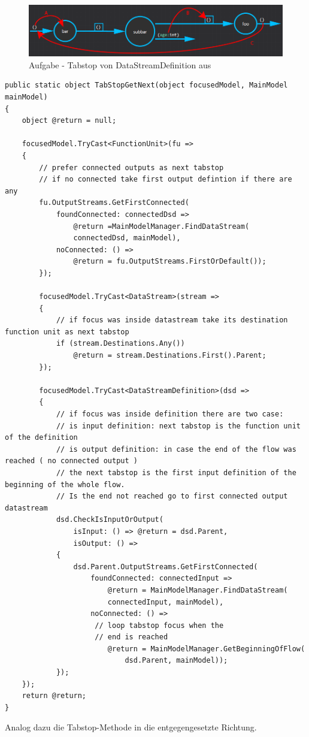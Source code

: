 \begin{enumerate}
	
	\begin{figure}[H]
		\centering
		\includegraphics[width=\linewidth]{./img/tabstop_datastreamdefiniton.png}
		\caption{Aufgabe - Tabstop von DataStreamDefinition aus}
	\end{figure}
	
	\begin{lstlisting}[caption=Tabstop vorwärts]
public static object TabStopGetNext(object focusedModel, MainModel mainModel)
{
	object @return = null;
	
	focusedModel.TryCast<FunctionUnit>(fu =>
	{
		// prefer connected outputs as next tabstop
		// if no connected take first output defintion if there are any
		fu.OutputStreams.GetFirstConnected(
			foundConnected: connectedDsd => 
				@return =MainModelManager.FindDataStream(
				connectedDsd, mainModel),
			noConnected: () => 
				@return = fu.OutputStreams.FirstOrDefault());
		});
		
		focusedModel.TryCast<DataStream>(stream =>
		{
			// if focus was inside datastream take its destination function unit as next tabstop
			if (stream.Destinations.Any())
				@return = stream.Destinations.First().Parent;
		});
		
		focusedModel.TryCast<DataStreamDefinition>(dsd =>
		{
			// if focus was inside definition there are two case:
			// is input definition: next tabstop is the function unit of the definition
			// is output definition: in case the end of the flow was reached ( no connected output ) 
			// the next tabstop is the first input definition of the beginning of the whole flow.
			// Is the end not reached go to first connected output datastream
			dsd.CheckIsInputOrOutput( 
				isInput: () => @return = dsd.Parent,
				isOutput: () =>
			{
				dsd.Parent.OutputStreams.GetFirstConnected(
					foundConnected: connectedInput => 
						@return = MainModelManager.FindDataStream(
						connectedInput, mainModel),
					noConnected: () =>
					 // loop tabstop focus when the 
					 // end is reached
						@return = MainModelManager.GetBeginningOfFlow(
							dsd.Parent, mainModel)); 
			});
	});
	return @return;
}

\end{lstlisting}
	Analog dazu die Tabstop-Methode in die entgegengesetzte Richtung.
	

\end{enumerate}
